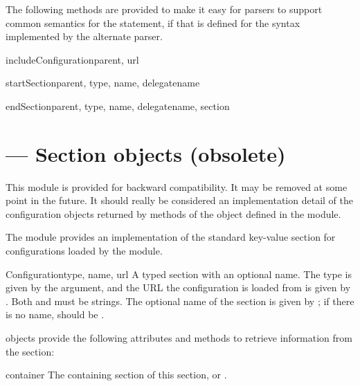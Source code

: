 \documentclass{howto}
\begin{document}
The following methods are provided to make it easy for parsers to
support common semantics for the  statement, if
that is defined for the syntax implemented by the alternate parser.

\begin{methoddesc}{includeConfiguration}{parent, url}
\end{methoddesc}

\begin{methoddesc}{startSection}{parent, type, name, delegatename}
\end{methoddesc}

\begin{methoddesc}{endSection}{parent, type, name, delegatename, section}
\end{methoddesc}


\section{ --- Section objects (obsolete)}



\begin{notice}[warning]
  This module is provided for backward compatibility.  It may be
  removed at some point in the future.  It should really be considered
  an implementation detail of the configuration objects returned by
  methods of the  object defined in the
   module.
\end{notice}

The  module provides an implementation of the
standard key-value section for configurations loaded by the
 module.

\begin{classdesc}{Configuration}{type, name, url}
  A typed section with an optional name.  The type is given by the
   argument, and the URL the configuration is loaded from is
  given by .  Both  and  must be strings.
  The optional name of the section is given by ; if there is
  no name,  should be .
\end{classdesc}

 objects provide the following attributes and
methods to retrieve information from the section:

\begin{memberdesc}[Configuration]{container}
  The containing section of this section, or .
\end{memberdesc}
\end{document}
